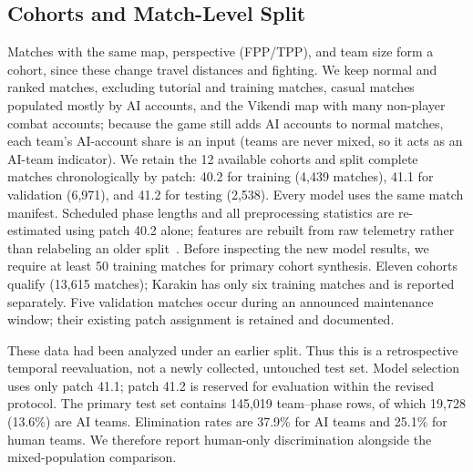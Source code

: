 \documentclass[sigconf,anonymous,nonacm]{acmart}
\begin{document}
\subsection{Cohorts and Match-Level Split}
\label{sec:method:cohort}
Matches with the same map, perspective (FPP/TPP), and team size form a cohort, since these change travel distances and fighting.
We keep normal and ranked matches, excluding tutorial and training matches, casual matches populated mostly by AI accounts, and the Vikendi map with many non-player combat accounts; because the game still adds AI accounts to normal matches, each team's AI-account share is an input (teams are never mixed, so it acts as an AI-team indicator).
We retain the 12 available cohorts and split complete matches chronologically by patch: 40.2 for training (4,439 matches), 41.1 for validation (6,971), and 41.2 for testing (2,538). Every model uses the same match manifest. Scheduled phase lengths and all preprocessing statistics are re-estimated using patch 40.2 alone; features are rebuilt from raw telemetry rather than relabeling an older split~\cite{Kaufman12}. Before inspecting the new model results, we require at least 50 training matches for primary cohort synthesis. Eleven cohorts qualify (13,615 matches); Karakin has only six training matches and is reported separately. Five validation matches occur during an announced maintenance window; their existing patch assignment is retained and documented.

These data had been analyzed under an earlier split. Thus this is a retrospective temporal reevaluation, not a newly collected, untouched test set. Model selection uses only patch 41.1; patch 41.2 is reserved for evaluation within the revised protocol.
The primary test set contains 145,019 team--phase rows, of which 19,728 (13.6\%) are AI teams. Elimination rates are 37.9\% for AI teams and 25.1\% for human teams. We therefore report human-only discrimination alongside the mixed-population comparison.
\end{document}
